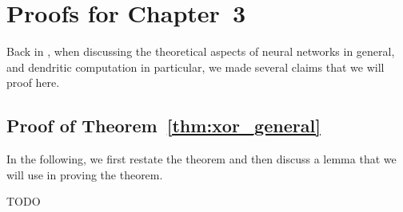 \section{Proofs for Chapter~3}
\label{app:neural_network_proofs}

Back in , when discussing the theoretical aspects of neural networks in general, and dendritic computation in particular, we made several claims that we will proof here.

\subsection{Proof of Theorem~\ref{thm:xor_general}}

In the following, we first restate the theorem and then discuss a lemma that we will use in proving the theorem.

TODO

%
%
%
%
%


